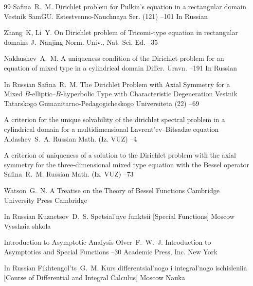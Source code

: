 \begin{thebibliography}{99}
\by Safina~R.~M.
\paper Dirichlet problem for Pulkin's equation in a rectangular domain
\jour Vestnik SamGU. Estestvenno-Nauchnaya Ser.
(121)
--101
\lang In Russian


\by Zhang~K, Li~Y.
\paper On Dirichlet problem of Tricomi-type equation in rectangular domains
\jour J.~Nanjing Norm. Univ., Nat. Sci. Ed.
--35 

\by Nakhushev~A.~M.
\paper A uniqueness condition of the Dirichlet problem for an equation of mixed type in a cylindrical domain
\jour Differ. Uravn.
--191
\lang In Russian

\lang In Russian
\by Safina~R.~M.
\paper The Dirichlet Problem with Axial Symmetry for a Mixed $B$-elliptic--$B$-hyperbolic Type with Characteristic Degeneration
\jour Vestnik Tatarskogo Gumanitarno-Pedagogicheskogo Universiteta
(22)
–69 

\paper A criterion for the unique solvability of the dirichlet spectral problem in a cylindrical domain for a multidimensional Lavrent'ev--Bitsadze equation
\by Aldashev~S.~A.
\jour Russian Math. (Iz. VUZ)
--4


\paper A criterion of uniqueness of a solution to the Dirichlet problem with the axial symmetry for the three-dimensional mixed type equation with the Bessel operator
\by Safina~R.~M.
\jour Russian Math. (Iz. VUZ)
--73

\by Watson~G.~N.
\book A Treatise on the Theory of Bessel Functions 
\publ Cambridge University Press 
\publaddr Cambridge 

\lang In Russian
\by Kuznetsov~D.~S.
\book Spetsial'nye funktsii \rm [Special Functions]
\publaddr Moscow
\publ Vysshaia shkola


\paper  Introduction to Asymptotic Analysis
\by Olver~F.~W.~J. 
\inbook Introduction to Asymptotics and Special Functions 
--30
\publ Academic Press, Inc.
\publaddr New York

\lang In Russian
\by Fikhtengol'ts~G.~M.
\book Kurs differentsial'nogo i integral'nogo ischisleniia \rm [Course of Differential and Integral Calculus]
\publaddr Moscow
\publ Nauka


\end{thebibliography}




%
